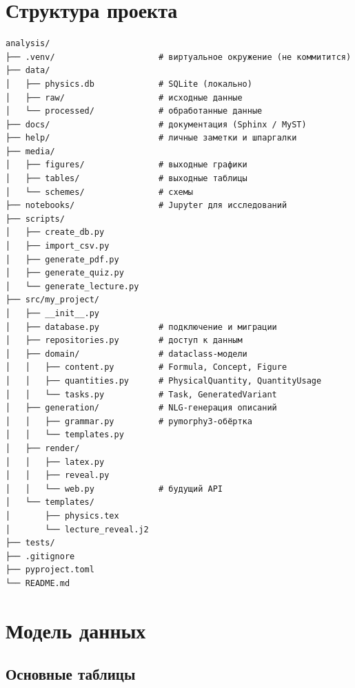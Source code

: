 \documentclass[12pt,a4paper]{article}
\begin{document}
\section{Структура проекта}

\begin{verbatim}
analysis/
├── .venv/                     # виртуальное окружение (не коммитится)
├── data/
│   ├── physics.db             # SQLite (локально)
│   ├── raw/                   # исходные данные
│   └── processed/             # обработанные данные
├── docs/                      # документация (Sphinx / MyST)
├── help/                      # личные заметки и шпаргалки
├── media/
│   ├── figures/               # выходные графики
│   ├── tables/                # выходные таблицы
│   └── schemes/               # схемы
├── notebooks/                 # Jupyter для исследований
├── scripts/
│   ├── create_db.py
│   ├── import_csv.py
│   ├── generate_pdf.py
│   ├── generate_quiz.py
│   └── generate_lecture.py
├── src/my_project/
│   ├── __init__.py
│   ├── database.py            # подключение и миграции
│   ├── repositories.py        # доступ к данным
│   ├── domain/                # dataclass-модели
│   │   ├── content.py         # Formula, Concept, Figure
│   │   ├── quantities.py      # PhysicalQuantity, QuantityUsage
│   │   └── tasks.py           # Task, GeneratedVariant
│   ├── generation/            # NLG-генерация описаний
│   │   ├── grammar.py         # pymorphy3-обёртка
│   │   └── templates.py
│   ├── render/
│   │   ├── latex.py
│   │   ├── reveal.py
│   │   └── web.py             # будущий API
│   └── templates/
│       ├── physics.tex
│       └── lecture_reveal.j2
├── tests/
├── .gitignore
├── pyproject.toml
└── README.md
\end{verbatim}

\section{Модель данных}

\subsection{Основные таблицы}
\end{document}
